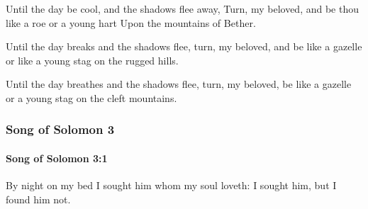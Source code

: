 			\begin{versebox}
					\item[BHS] 
					\item[LXX] 
					\item[ASV] Until the day be cool, and the shadows flee away, Turn, my beloved, and be thou like a roe or a young hart Upon the mountains of Bether.
					\item[NIV] Until the day breaks and the shadows flee, turn, my beloved, and be like a gazelle or like a young stag on the rugged hills.
					\item[NRSV] Until the day breathes and the shadows flee, turn, my beloved, be like a gazelle or a young stag on the cleft mountains.
			\end{versebox}
	\subsubsection{Song of Solomon 3} %
		\label{SONGOFSOLOMON-3}

		\paragraph{Song of Solomon 3:1} %
			\label{SONGOFSOLOMON-3-1}

			By night on my bed I sought him whom my soul loveth: I sought him, but I found him not.

